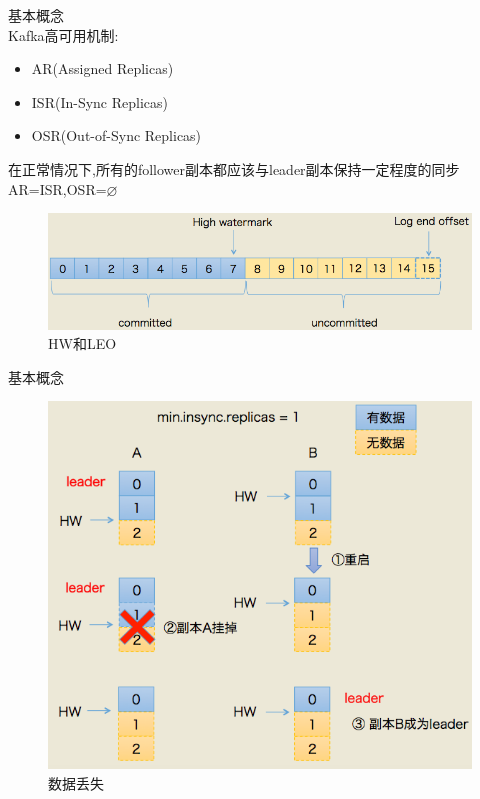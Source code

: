 \begin{frame}[plain,t]{基本概念} %
		 \\  
	 \vspace{2ex}
	 Kafka高可用机制:
	 \begin{itemize}
	 	\item AR(Assigned Replicas)
	 	\item ISR(In-Sync Replicas)
	 	\item OSR(Out-of-Sync Replicas)
	 \end{itemize}
 \vspace{2ex}
 
 在正常情况下,所有的follower副本都应该与leader副本保持一定程度的同步
 AR=ISR,OSR=$\varnothing$
 
 \begin{figure}
 	\centering
 	\includegraphics[width=0.9\linewidth]{image/0105}
 	\caption{HW和LEO}
 	\label{fig:0105}
 \end{figure}
 
	
\end{frame}
\begin{frame}[plain,t]{基本概念} %
 \\  
	\vspace{1ex}

	 \begin{figure}
		\centering
		\includegraphics[width=0.75\linewidth]{image/0106}
		\caption{数据丢失}
		\label{fig:0106}
	\end{figure}
	
\end{frame}
